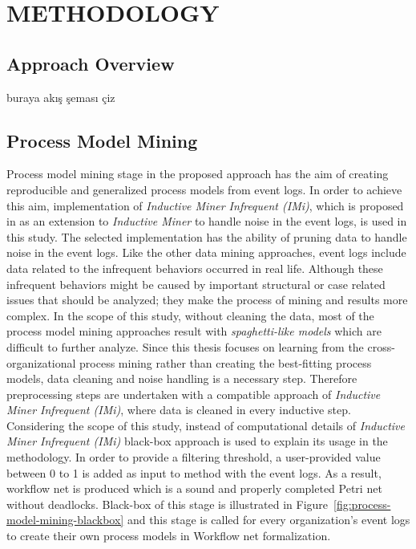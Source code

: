 \chapter{METHODOLOGY}
\label{chp:methodology}


\section{Approach Overview}
\label{sec:approach-overview}
buraya akış şeması çiz

\section{Process Model Mining}
\label{sec:process-model-mining}
Process model mining stage in the proposed approach has the aim of creating reproducible and generalized process models from event logs. In order to achieve this aim, implementation of \textit{Inductive Miner Infrequent (IMi)}, which is proposed in \cite{leemans2014discoveringinfrequent} as an extension to \textit{Inductive Miner} to handle noise in the event logs, is used in this study. 
The selected implementation has the ability of pruning data to handle noise in the event logs. Like the other data mining approaches, event logs include data related to the infrequent behaviors occurred in real life. Although these infrequent behaviors might be caused by important structural or case related issues that should be analyzed; they make the process of mining and results more complex. In the scope of this study, without cleaning the data, most of the process model mining approaches result with \textit{spaghetti-like models}\cite{van2011process} which are difficult to further analyze. Since this thesis focuses on learning from the cross-organizational process mining rather than creating the best-fitting process models, data cleaning and noise handling is a necessary step. Therefore preprocessing steps are undertaken with a compatible approach of \textit{Inductive Miner Infrequent (IMi)}, where data is cleaned in every inductive step.
Considering the scope of this study, instead of computational details of \textit{Inductive Miner Infrequent (IMi)} black-box approach is used to explain its usage in the methodology. In order to provide a filtering threshold, a user-provided value between 0 to 1 is added as input to method with the event logs. As a result, workflow net is produced which is a sound and properly completed Petri net without deadlocks. Black-box of this stage is illustrated in Figure~\ref{fig:process-model-mining-blackbox} and this stage is called for every organization's event logs to create their own process models in Workflow net formalization.

